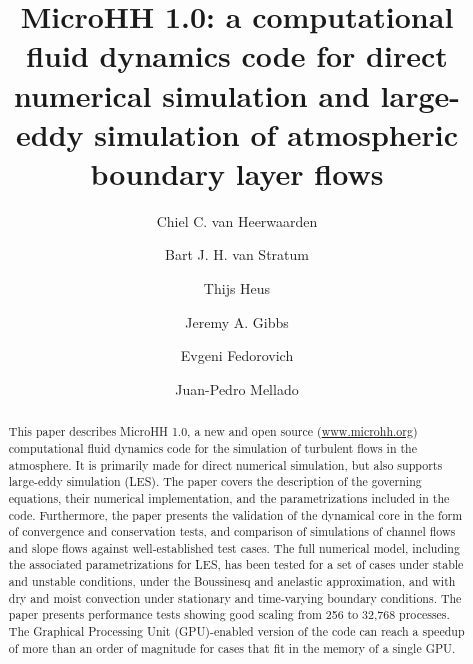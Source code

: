 \documentclass[gmd,manuscript]{copernicus}
\begin{document}
\linenumbers

\title{MicroHH 1.0: a computational fluid dynamics code for direct numerical simulation and large-eddy simulation of atmospheric boundary layer flows}

\author[1,2]{Chiel C. van Heerwaarden}
\author[1,2]{Bart J. H. van Stratum}
\author[3]{Thijs Heus}
\author[4]{Jeremy A. Gibbs}
\author[5]{Evgeni Fedorovich}
\author[2]{Juan-Pedro Mellado}






\received{}
\pubdiscuss{} %
\revised{}
\accepted{}
\published{}



\maketitle  %

\begin{abstract}
This paper describes MicroHH 1.0, a new and open source (\url{www.microhh.org}) computational fluid dynamics code for the simulation of turbulent flows in the atmosphere. It is primarily made for direct numerical simulation, but also supports large-eddy simulation (LES). The paper covers the description of the governing equations, their numerical implementation, and the parametrizations included in the code. Furthermore, the paper presents the validation of the dynamical core in the form of convergence and conservation tests, and comparison of simulations of channel flows and slope flows against well-established test cases. The full numerical model, including the associated parametrizations for LES, has been tested for a set of cases under stable and unstable conditions, under the Boussinesq and anelastic approximation, and with dry and moist convection under stationary and time-varying boundary conditions. The paper presents performance tests showing good scaling from 256 to 32,768 processes. The Graphical Processing Unit (GPU)-enabled version of the code can reach a speedup of more than an order of magnitude for cases that fit in the memory of a single GPU.
\end{abstract}
\end{document}
